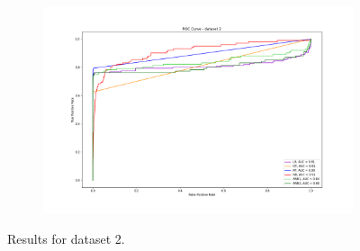 \documentclass{Configuration_Files/PoliMi3i_thesis}
\begin{document}
\begin{figure}[H]
\begin{subfigure}
    \centering
    \includegraphics[scale=0.3]{Images/ROC_2.png}
\end{subfigure}
  \caption{Results for dataset 2.}
\end{figure}
\end{document}
